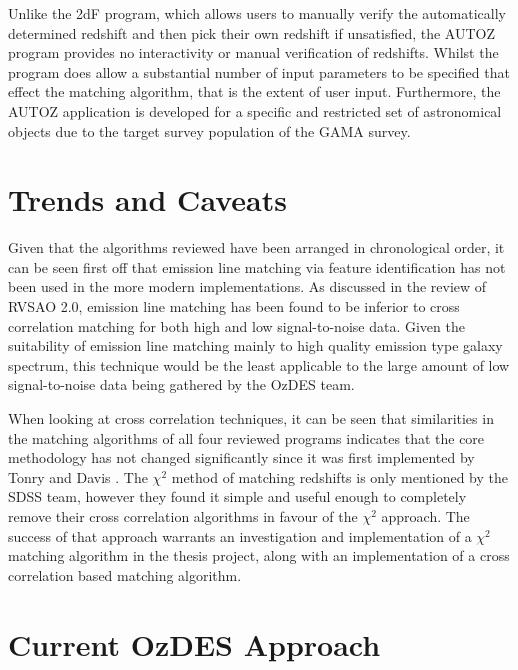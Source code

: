 \documentclass[titlesmallcaps, examinerscopy, copyrightpage]{uqthesis}
\begin{document}
Unlike the 2dF program, which allows users to manually verify the automatically determined redshift and then pick their own redshift if unsatisfied, the \textsc{AUTOZ} program provides no interactivity or manual verification of redshifts. Whilst the program does allow a substantial number of input parameters to be specified that effect the matching algorithm, that is the extent of user input. Furthermore, the \textsc{AUTOZ} application is developed for a specific and restricted set of astronomical objects due to the target survey population of the GAMA survey.

\section{Trends and Caveats}

Given that the algorithms reviewed have been arranged in chronological order, it can be seen first off that emission line matching via feature identification has not been used in the more modern implementations. As discussed in the review of RVSAO 2.0, emission line matching has been found to be inferior to cross correlation matching for both high and low signal-to-noise data. Given the suitability of emission line matching mainly to high quality emission type galaxy spectrum, this technique would be the least applicable to the large amount of low signal-to-noise data being gathered by the OzDES team.

When looking at cross correlation techniques, it can be seen that similarities in the matching algorithms of all four reviewed programs indicates that the core methodology has not changed significantly since it was first implemented by Tonry and Davis \cite{tonry1979survey}. The $\chi^2$ method of matching redshifts is only mentioned by the SDSS team, however they found it simple and useful enough to completely remove their cross correlation algorithms in favour of the $\chi^2$ approach. The success of that approach warrants an investigation and implementation of a $\chi^2$ matching algorithm in the thesis project, along with an implementation of a cross correlation based matching algorithm.


\section{Current OzDES Approach}
\end{document}
